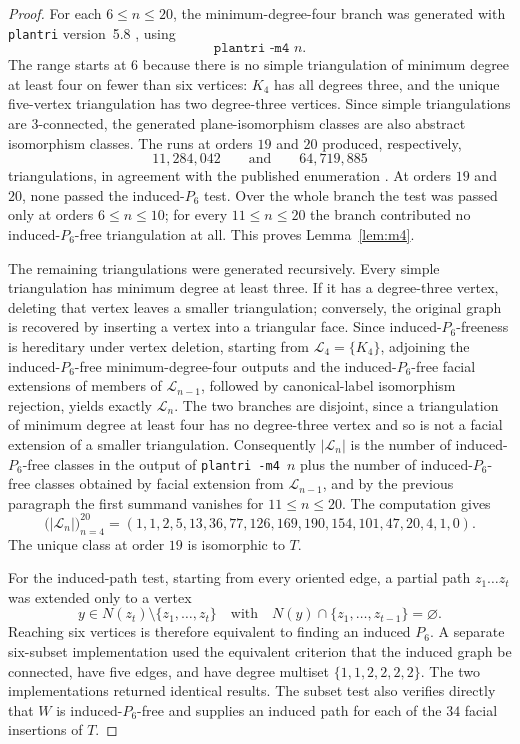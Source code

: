 \documentclass[11pt]{amsart}
\newcommand{\cL}{\mathcal L}
\begin{document}
\begin{proof}
For each $6\leq n\leq 20$, the minimum-degree-four branch was generated
with \texttt{plantri} version~5.8 \cite{Plantri,BrinkmannMcKay}, using
\[
  \texttt{plantri -m4 $n$}.
\]
The range starts at $6$ because there is no simple triangulation of minimum
degree at least four on fewer than six vertices: $K_4$ has all degrees three,
and the unique five-vertex triangulation has two degree-three vertices.
Since simple triangulations are $3$-connected, the generated plane-isomorphism
classes are also abstract isomorphism classes. The runs at orders $19$ and
$20$ produced, respectively,
\[
  11{,}284{,}042
  \qquad\text{and}\qquad
  64{,}719{,}885
\]
triangulations, in agreement with the published enumeration
\cite[Table~3]{BrinkmannMcKayFull}. At orders $19$ and $20$, none passed the
induced-$P_6$ test. Over the whole branch the test was passed only at orders
$6\leq n\leq 10$; for every $11\leq n\leq 20$ the branch contributed no
induced-$P_6$-free triangulation at all. This proves Lemma~\ref{lem:m4}.

The remaining triangulations were generated recursively. Every simple
triangulation has minimum degree at least three. If it has a degree-three
vertex, deleting that vertex leaves a smaller triangulation; conversely,
the original graph is recovered by inserting a vertex into a triangular
face. Since induced-$P_6$-freeness is hereditary under vertex deletion,
starting from $\cL_4=\{K_4\}$, adjoining the induced-$P_6$-free
minimum-degree-four outputs and the induced-$P_6$-free facial extensions of
members of $\cL_{n-1}$, followed by canonical-label isomorphism
rejection, yields exactly $\cL_n$. The two branches are disjoint, since a
triangulation of minimum degree at least four has no degree-three vertex and
so is not a facial extension of a smaller triangulation. Consequently
$|\cL_n|$ is the number of induced-$P_6$-free classes in the output of
\texttt{plantri -m4 $n$} plus the number of induced-$P_6$-free classes
obtained by facial extension from $\cL_{n-1}$, and by the previous paragraph
the first summand vanishes for $11\leq n\leq 20$. The computation gives
\[
  \bigl(|\cL_n|\bigr)_{n=4}^{20}
  =(1,1,2,5,13,36,77,126,169,190,154,101,47,20,4,1,0).
\]
The unique class at order $19$ is isomorphic to $T$.

For the induced-path test, starting from every oriented edge, a partial path
$z_1\ldots z_t$ was extended only to a vertex
\[
  y\in N(z_t)\setminus\{z_1,\ldots,z_t\}
  \quad\text{with}\quad
  N(y)\cap\{z_1,\ldots,z_{t-1}\}=\varnothing.
\]
Reaching six vertices is therefore equivalent to finding an induced
$P_6$. A separate six-subset implementation used the equivalent criterion
that the induced graph be connected, have five edges, and have degree
multiset $\{1,1,2,2,2,2\}$. The two implementations returned identical
results. The subset test also verifies directly that $W$ is
induced-$P_6$-free and supplies an induced path for each of the $34$ facial
insertions of $T$.
\end{proof}
\end{document}
